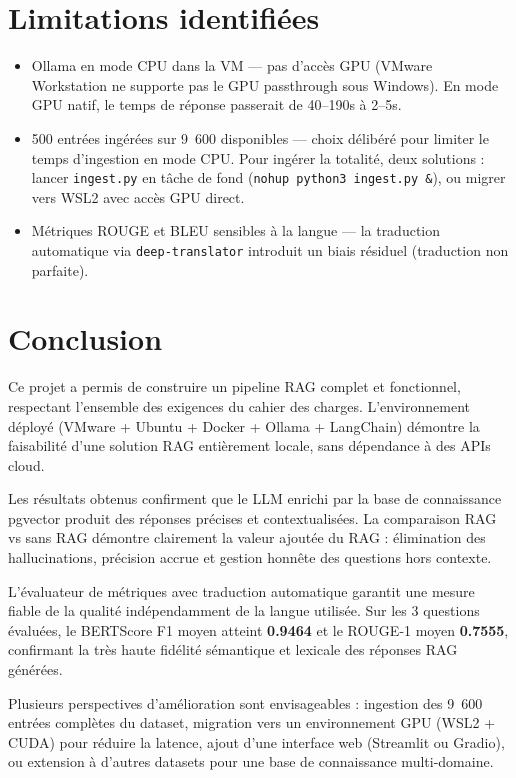 \documentclass[12pt,a4paper]{report}
\begin{document}
\section{Limitations identifiées}

\begin{itemize}[leftmargin=1.5cm]
  \item Ollama en mode CPU dans la VM — pas d'accès GPU (VMware Workstation
        ne supporte pas le GPU passthrough sous Windows). En mode GPU natif,
        le temps de réponse passerait de 40--190s à 2--5s.
  \item 500 entrées ingérées sur 9~600 disponibles — choix délibéré pour
        limiter le temps d'ingestion en mode CPU. Pour ingérer la totalité,
        deux solutions : lancer \texttt{ingest.py} en tâche de fond
        (\texttt{nohup python3 ingest.py \&}), ou migrer vers WSL2 avec
        accès GPU direct.
  \item Métriques ROUGE et BLEU sensibles à la langue — la traduction automatique
        via \texttt{deep-translator} introduit un biais résiduel (traduction non
        parfaite).
\end{itemize}

\section{Conclusion}

Ce projet a permis de construire un pipeline RAG complet et fonctionnel,
respectant l'ensemble des exigences du cahier des charges. L'environnement
déployé (VMware + Ubuntu + Docker + Ollama + LangChain) démontre la faisabilité
d'une solution RAG entièrement locale, sans dépendance à des APIs cloud.

Les résultats obtenus confirment que le LLM enrichi par la base de connaissance
pgvector produit des réponses précises et contextualisées. La comparaison RAG
vs sans RAG démontre clairement la valeur ajoutée du RAG : élimination des
hallucinations, précision accrue et gestion honnête des questions hors contexte.

L'évaluateur de métriques avec traduction automatique garantit une mesure fiable
de la qualité indépendamment de la langue utilisée. Sur les 3 questions évaluées,
le BERTScore F1 moyen atteint \textbf{0.9464} et le ROUGE-1 moyen \textbf{0.7555},
confirmant la très haute fidélité sémantique et lexicale des réponses RAG générées.

Plusieurs perspectives d'amélioration sont envisageables : ingestion des 9~600
entrées complètes du dataset, migration vers un environnement GPU (WSL2 + CUDA)
pour réduire la latence, ajout d'une interface web (Streamlit ou Gradio), ou
extension à d'autres datasets pour une base de connaissance multi-domaine.
\end{document}
